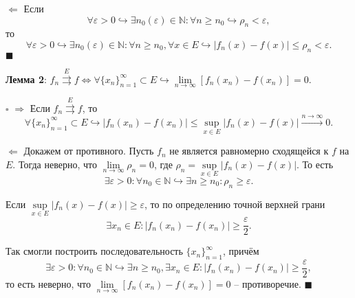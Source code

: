 \documentclass[12pt, a4paper, reqno]{article}
\begin{document}
    $\boxed{\Leftarrow}$
    Если
    \begin{equation*}
        \forall \varepsilon > 0 \hookrightarrow \exists n_0(\varepsilon) \in \mathbb{N}: \forall n \geq n_0
        \hookrightarrow \rho_n < \varepsilon,
    \end{equation*}
    то
    \begin{equation*}
        \forall \varepsilon > 0 \hookrightarrow \exists n_0(\varepsilon) \in \mathbb{N}: \forall n \geq n_0,
        \forall x \in E \hookrightarrow |f_n(x) - f(x)| \leq \rho_n < \varepsilon.
    \end{equation*}
    $\blacksquare$

    \textbf{Лемма 2}: $f_n \overset{E}{\rightrightarrows} f \iff \forall \{x_n\}_{n = 1}^{\infty}
    \subset E \hookrightarrow \lim\limits_{n \to \infty} [f_n(x_n) - f(x_n)] = 0$.

    $\square$
    $\boxed{\Rightarrow}$ Если $f_n \overset{E}{\rightrightarrows} f$, то
    \begin{equation*}
        \forall \{x_n\}_{n = 1}^{\infty} \subset E \hookrightarrow
        |f_n(x_n) - f(x_n)| \leq \sup\limits_{x \in E} |f_n(x) - f(x)| \overset{n \to \infty}{\longrightarrow} 0.
    \end{equation*}

    $\boxed{\Leftarrow}$ Докажем от противного. Пусть $f_n$ не является равномерно сходящейся к $f$
    на $E$. Тогда неверно, что $\lim\limits_{n \to \infty} \rho_n = 0$, где
    $\rho_n = \sup\limits_{x \in E} |f_n(x) - f(x)|$. То есть
    \begin{equation*}
        \exists \varepsilon > 0: \forall n_0 \in \mathbb{N} \hookrightarrow \exists n \geq n_0:
        \rho_n \geq \varepsilon.
    \end{equation*}

    Если $\sup\limits_{x \in E} |f_n(x) - f(x)| \geq \varepsilon$, то по определению точной верхней
    грани
    \begin{equation*}
        \exists x_n \in E: |f_n(x_n) - f(x_n)| \geq \frac{\varepsilon}{2}.
    \end{equation*}

    Так смогли построить последовательность $\{x_n\}_{n = 1}^{\infty}$, причём
    \begin{equation*}
        \exists \varepsilon > 0: \forall n_0 \in \mathbb{N} \hookrightarrow \exists n \geq n_0,
        \exists x_n \in E: |f_n(x_n) - f(x_n)| \geq \frac{\varepsilon}{2},
    \end{equation*}
    то есть неверно, что $\lim\limits_{n \to \infty} [f_n(x_n) - f(x_n)] = 0$ -- противоречие.
    $\blacksquare$
\end{document}
